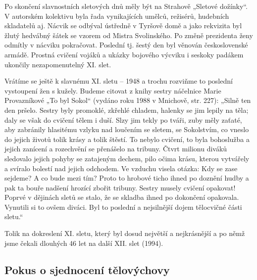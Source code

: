 Po skončení slavnostních sletových dnů měly být na Strahově „Sletové
dožínky``. V autorském kolektivu byla řada vynikajících umělců,
režisérů, hudebních skladatelů aj. Nácvik se odbýval ústředně v Tyršově
domě a jako rekvizita byl žlutý hedvábný šátek se vzorem od Mistra
Svolinského. Po změně prezidenta ženy odmítly v nácviku pokračovat.
Poslední tj. šestý den byl věnován československé armádě. Prostná
cvičení vojáků a ukázky bojového výcviku i seskoky padákem ukončily
nezapomenutelný XI. slet.

Vrátíme se ještě k slavnému XI. sletu -- 1948 a trochu rozviňme to
poslední vystoupení žen s kužely. Budeme citovat z knihy sestry
náčelnice Marie Provazníkové „To byl Sokol`` (vydáno roku 1988 v
Mnichově, str. 227): „Silně ten den pršelo. Sestry byly promoklé,
zkřehlé chladem, halenky se jim lepily na těla; daly se však do cvičení
tělem i duší. Slzy jim tekly po tváři, zuby měly zaťaté, aby zabránily
hlasitému vzlyku nad loučením se sletem, se Sokolstvím, co vneslo do
jejich životů tolik krásy a tolik štěstí. To nebylo cvičení, to byla
bohoslužba a jejich zanícení a rozechvění se přenášelo na tribuny. Čtvrt
milionu diváků sledovalo jejich pohyby se zatajeným dechem, pilo očima
krásu, kterou vytvářely a svíralo bolestí nad jejich odchodem. Ve
vzduchu visela otázka: Kdy se zase sejdeme? A co bude mezi tím? Proto to
hrobové ticho ihned po doznění hudby a pak ta bouře nadšení hrozící
zbořit tribuny. Sestry musely cvičení opakovat! Poprvé v dějinách sletů
se stalo, že se skladba ihned po dokončení opakovala. Vynutili si to
ovšem diváci. Byl to poslední a nejsilnější dojem tělocvičné části
sletu.``

Tolik na dokreslení XI. sletu, který byl dosud největší a nejkrásnější a
po němž jsme čekali dlouhých 46 let na další XII. slet (1994).

\subsection{Pokus o sjednocení
tělovýchovy}\label{pokus-o-sjednocenuxed-tux11blovuxfdchovy}

